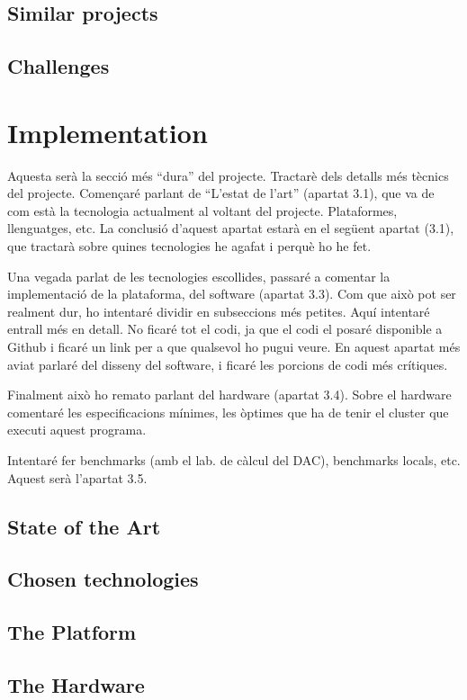 \documentclass[a4paper,12pt]{article}
\begin{document}
\subsection{Similar projects}
\subsection{Challenges}

\section{Implementation}

Aquesta serà la secció més ``dura'' del projecte. Tractarè dels detalls més
tècnics del projecte. Començaré parlant de ``L'estat de l'art'' (apartat 3.1),
que va de com està la tecnologia actualment al voltant del projecte.
Plataformes, llenguatges, etc. La conclusió d'aquest apartat estarà en el
següent apartat (3.1), que tractarà sobre quines tecnologies he agafat i perquè
ho he fet.

Una vegada parlat de les tecnologies escollides, passaré a comentar la
implementació de la plataforma, del software (apartat 3.3). Com que això pot
ser realment dur, ho intentaré dividir en subseccions més petites. Aquí
intentaré entrall més en detall. No ficaré tot el codi, ja que el codi el
posaré disponible a Github i ficaré un link per a que qualsevol ho pugui veure.
En aquest apartat més aviat parlaré del disseny del software, i ficaré les
porcions de codi més crítiques.

Finalment això ho remato parlant del hardware (apartat 3.4). Sobre el hardware
comentaré les especificacions mínimes, les òptimes que ha de tenir el cluster
que executi aquest programa.

Intentaré fer benchmarks (amb el lab. de càlcul del DAC), benchmarks locals,
etc. Aquest serà l'apartat 3.5.

\subsection{State of the Art}
\subsection{Chosen technologies}
\subsection{The Platform}
\subsection{The Hardware}
\end{document}
